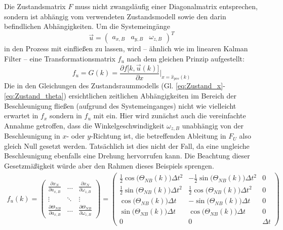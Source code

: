 \documentclass[12pt,a4paper]{article}
\begin{document}
	Die Zustandsmatrix $F$ muss nicht zwangsläufig einer Diagonalmatrix entsprechen, sondern ist abhängig vom verwendeten Zustandsmodell sowie den darin befindlichen Abhängigkeiten.
	Um die Systemeingänge 
	\begin{equation}\label{eq:Systemeingänge}
		\vec{u}=\begin{pmatrix} a_{x,B} & a_{y,B} & \omega_{z,B} \end{pmatrix}^{T}
	\end{equation}
	in den Prozess mit einfließen zu lassen, wird -- ähnlich wie im linearen Kalman Filter -- eine Transformationsmatrix $f_{u}$ nach dem gleichen Prinzip aufgestellt:
	\begin{equation}
		f_{u}=G(k)=\frac{\partial f\big[k, \vec{u}(k)\big]}{\partial x}\Bigg \vert_{x=\hat{x}_{pos}(k)}
	\end{equation}	
	Die in den Gleichungen des Zustandsraummodells (Gl. \ref{eq:Zustand_x}-\ref{eq:Zustand_theta}) ersichtlichen zeitlichen Abhängigkeiten im Bereich der Beschleunigung fließen (aufgrund des Systemeinganges) nicht wie vielleicht erwartet in $f_{x}$ sondern in $f_{u}$ mit ein. Hier wird zunächst auch die vereinfachte Annahme getroffen, dass die Winkelgeschwindigkeit $\omega_{z,B}$ unabhängig von der Beschleunigung in $x$- oder $y$-Richtung ist, die betreffenden Ableitung in $F_{U}$ also gleich Null gesetzt werden. Tatsächlich ist dies nicht der Fall, da eine ungleiche Beschleunigung ebenfalls eine Drehung hervorrufen kann. Die Beachtung dieser Gesetzmäßigkeit würde aber den Rahmen dieses Beispiels sprengen.\\
	\begin{gather}\label{eq:Systemeingangstransformationsmatrix}
		f_{u}(k)=
		\begin{pmatrix}
		\frac{\partial x_{N}}{\partial a_{x,B}} & \ldots & \frac{\partial x_{N}}{\partial \omega_{z,B}} \\
		\vdots & \ddots & \vdots \\
		\frac{\partial \Theta_{NB}}{\partial a_{x,B}} & \ldots & \frac{\partial \Theta_{NB}}{\partial \omega_{z,B}}
		\end{pmatrix}=
		\begin{pmatrix}
			\frac{1}{2}\cos\big(\Theta_{NB}(k)\big)\Delta t^{2} & -\frac{1}{2}\sin\big(\Theta_{NB}(k)\big)\Delta t^{2} & 0 \\[0.5em]
			\frac{1}{2}\sin\big(\Theta_{NB}(k)\big)\Delta t^{2} & \frac{1}{2}\cos\big(\Theta_{NB}(k)\big)\Delta t^{2} & 0 \\[0.5em]
			\cos\big(\Theta_{NB}(k)\big)\Delta t & -\sin\big(\Theta_{NB}(k)\big)\Delta t & 0 \\[0.5em]
			\sin\big(\Theta_{NB}(k)\big)\Delta t & \cos\big(\Theta_{NB}(k)\big)\Delta t & 0 \\[0.5em]
			0 & 0 & \Delta t
		\end{pmatrix}	
	\end{gather}
\end{document}
